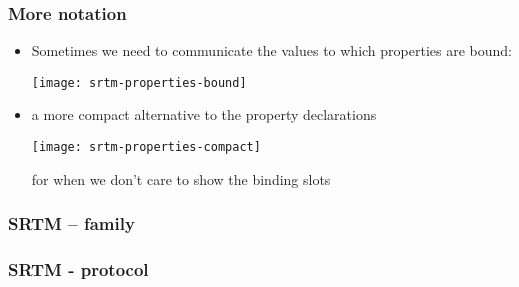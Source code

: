 
\begin{frame}
%
  \frametitle{More notation}
%
  \begin{itemize}
%
  \item Sometimes we need to communicate the values to which properties are bound:

      \texttt{[image: srtm-properties-bound]}

  \item a more compact alternative to the property declarations

      \texttt{[image: srtm-properties-compact]}

    for when we don't care to show the binding slots
%
  \end{itemize}
%
\end{frame}

\begin{frame}
%
  \frametitle{SRTM -- family}
%
  \begin{center}
  \end{center}
%
\end{frame}

\begin{frame}
%
  \frametitle{SRTM - protocol}
%
  \begin{center}
  \end{center}
%
\end{frame}

